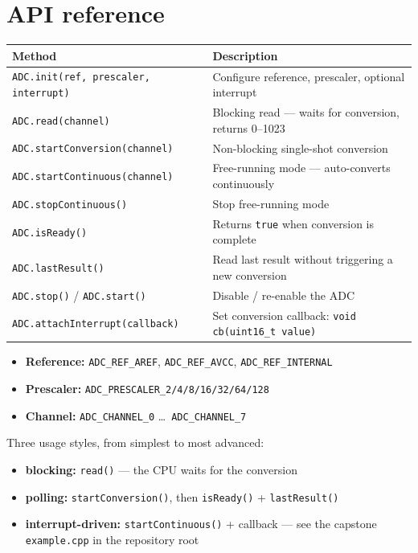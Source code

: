 \documentclass[11pt,a4paper]{article}
\begin{document}
\section{API reference}

\begin{center}
\small
\begin{tabular}{ll}
\toprule
\textbf{Method} & \textbf{Description} \\
\midrule
\texttt{ADC.init(ref, prescaler, interrupt)} & Configure reference, prescaler, optional interrupt \\
\texttt{ADC.read(channel)} & Blocking read --- waits for conversion, returns 0--1023 \\
\texttt{ADC.startConversion(channel)} & Non-blocking single-shot conversion \\
\texttt{ADC.startContinuous(channel)} & Free-running mode --- auto-converts continuously \\
\texttt{ADC.stopContinuous()} & Stop free-running mode \\
\texttt{ADC.isReady()} & Returns \texttt{true} when conversion is complete \\
\texttt{ADC.lastResult()} & Read last result without triggering a new conversion \\
\texttt{ADC.stop()} / \texttt{ADC.start()} & Disable / re-enable the ADC \\
\texttt{ADC.attachInterrupt(callback)} & Set conversion callback: \texttt{void cb(uint16\_t value)} \\
\bottomrule
\end{tabular}
\end{center}

\begin{itemize}
  \item \textbf{Reference:} \texttt{ADC\_REF\_AREF}, \texttt{ADC\_REF\_AVCC}, \texttt{ADC\_REF\_INTERNAL}
  \item \textbf{Prescaler:} \texttt{ADC\_PRESCALER\_2/4/8/16/32/64/128}
  \item \textbf{Channel:} \texttt{ADC\_CHANNEL\_0} \dots\ \texttt{ADC\_CHANNEL\_7}
\end{itemize}

Three usage styles, from simplest to most advanced:
\begin{itemize}
  \item \textbf{blocking:} \texttt{read()} --- the CPU waits for the conversion
  \item \textbf{polling:} \texttt{startConversion()}, then \texttt{isReady()} + \texttt{lastResult()}
  \item \textbf{interrupt-driven:} \texttt{startContinuous()} + callback --- see the
        capstone \texttt{example.cpp} in the repository root
\end{itemize}
\end{document}
